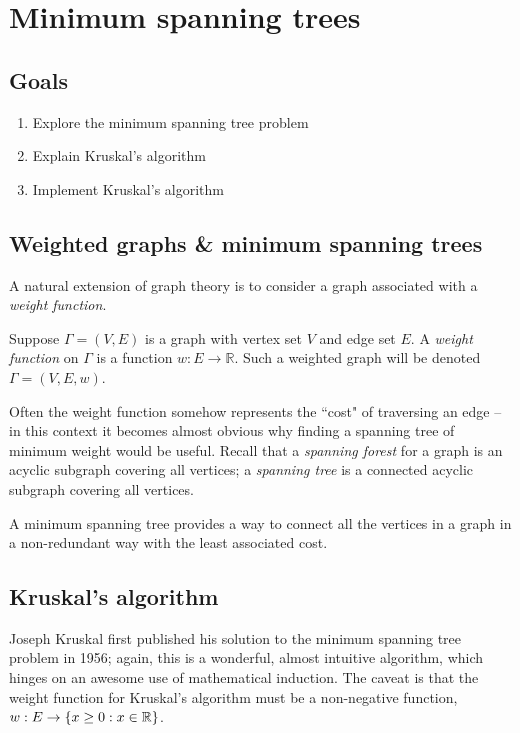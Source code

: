 \documentclass[m3380-lec-main.tex]{subfiles}
\begin{document}
\chapter{Minimum spanning trees}

\section*{Goals}
\begin{enumerate}[1.~]\setlength{\itemsep}{0pt}
\item Explore the minimum spanning tree problem
\item Explain Kruskal's algorithm
\item Implement Kruskal's algorithm
\end{enumerate}

\section{Weighted graphs \& minimum spanning trees} A natural extension of graph theory is to consider a graph associated with a \emph{weight function}.

\begin{defn} Suppose $\Gamma=(V,E)$ is a graph with vertex set $V$ and edge set $E$. A \emph{weight function} on $\Gamma$ is a function $w:E\to \mathbb{R}$. Such a weighted graph will be denoted $\Gamma=(V,E,w)$.
\end{defn}

Often the weight function somehow represents the ``cost" of traversing an edge -- in this context it becomes almost obvious why finding a spanning tree of minimum weight would be useful. Recall that a \emph{spanning forest} for a graph is an acyclic subgraph covering all vertices; a \emph{spanning tree} is a connected acyclic subgraph covering all vertices.

A minimum spanning tree provides a way to connect all the vertices in a graph in a non-redundant way with the least associated cost.

\section{Kruskal's algorithm} Joseph Kruskal first published his solution to the minimum spanning tree problem in 1956; again, this is a wonderful, almost intuitive algorithm, which hinges on an awesome use of mathematical induction. The caveat is that the weight function for Kruskal's algorithm must be a non-negative function, $w:E\to \left\{x\geq 0:x\in \mathbb{R}\right\}$.
\end{document}

